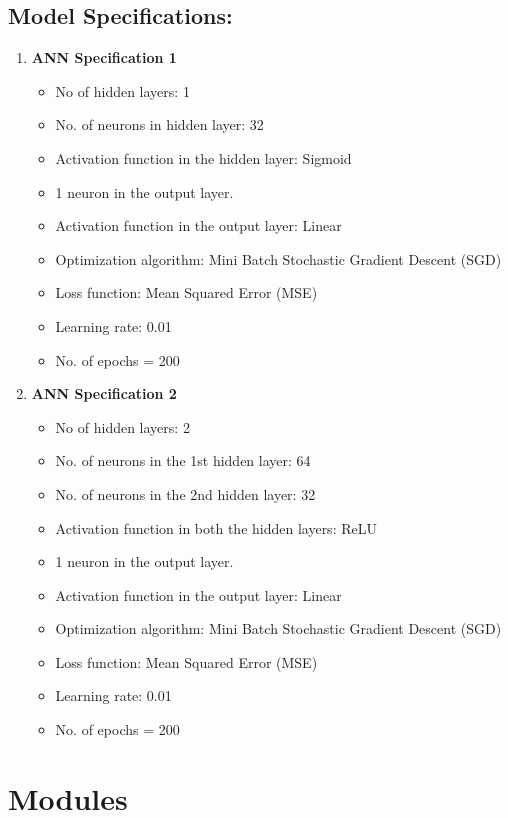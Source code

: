 \documentclass[12pt]{article}
\begin{document}
	\subsection{Model Specifications:} \label{subsec:model-specifications}
	\begin{enumerate}
		\item \textbf{ANN Specification 1}
		\begin{itemize}
			\item No of hidden layers: 1
			\item No. of neurons in hidden layer: 32
			\item Activation function in the hidden layer: Sigmoid
			\item 1 neuron in the output layer.
			\item Activation function in the output layer: Linear
			\item Optimization algorithm: Mini Batch Stochastic Gradient Descent (SGD)
			\item Loss function: Mean Squared Error (MSE)
			\item Learning rate: 0.01
			\item No. of epochs = 200
		\end{itemize}
		\item \textbf{ANN Specification 2}
		\begin{itemize}
			\item No of hidden layers: 2
			\item No. of neurons in the 1st hidden layer: 64
			\item No. of neurons in the 2nd hidden layer: 32
			\item Activation function in both the hidden layers: ReLU
			\item 1 neuron in the output layer.
			\item Activation function in the output layer: Linear
			\item Optimization algorithm: Mini Batch Stochastic Gradient Descent (SGD)
			\item Loss function: Mean Squared Error (MSE)
			\item Learning rate: 0.01
			\item No. of epochs = 200
		\end{itemize}
	\end{enumerate}
	
	\section{Modules}
	
\end{document}
